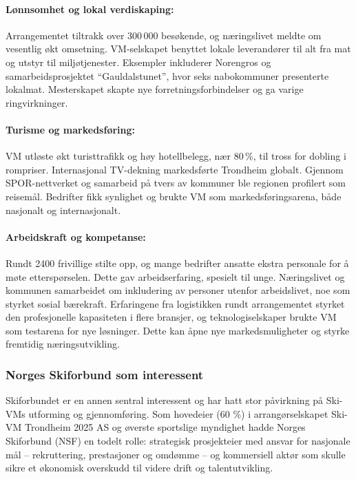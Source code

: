 \paragraph{Lønnsomhet og lokal verdiskaping:} Arrangementet tiltrakk over 300\,000 
besøkende\cite{Norengros2024}, og næringslivet meldte om vesentlig økt omsetning. 
VM-selskapet benyttet lokale leverandører til alt fra mat og utstyr til miljøtjenester. 
Eksempler inkluderer Norengros og samarbeidsprosjektet “Gauldalstunet”, hvor seks 
nabokommuner presenterte lokalmat\cite{NiT2024}. Mesterskapet skapte nye 
forretningsforbindelser og ga varige ringvirkninger.

\paragraph{Turisme og markedsføring:} VM utløste økt turisttrafikk og høy hotellbelegg, nær 80\,\%,
til tross for dobling i rompriser\cite{Finansavisen2025}. Internasjonal TV-dekning 
markedsførte Trondheim globalt. Gjennom SPOR-nettverket og samarbeid på tvers av kommuner 
ble regionen profilert som reisemål\cite{NiT2024}. Bedrifter fikk synlighet og brukte VM 
som markedsføringsarena, både nasjonalt og internasjonalt.



\paragraph{Arbeidskraft og kompetanse:} Rundt 2400 frivillige stilte 
opp\cite{TrondheimKommune2023}, og mange bedrifter ansatte ekstra personale for å møte 
etterspørselen. Dette gav arbeidserfaring, spesielt til unge. Næringslivet og kommunen 
samarbeidet om inkludering av personer utenfor arbeidslivet, noe som styrket sosial bærekraft. 
Erfaringene fra logistikken rundt arrangementet styrket den profesjonelle kapasiteten 
i flere bransjer, og teknologiselskaper brukte VM som testarena for nye løsninger. 
Dette kan åpne nye markedsmuligheter og styrke fremtidig næringsutvikling.


\subsubsection{Norges Skiforbund som interessent}
Skiforbundet er en annen sentral interessent og har hatt stor påvirkning på Ski-VMs utforming 
og gjennomføring. Som hovedeier (60 \%) i arrangørselskapet Ski-VM Trondheim 2025 AS og øverste 
sportslige myndighet hadde Norges Skiforbund (NSF) en todelt rolle: strategisk prosjekteier med 
ansvar for nasjonale mål -- rekruttering, prestasjoner og omdømme -- og kommersiell aktør som 
skulle sikre et økonomisk overskudd til videre drift og talentutvikling\cite{ProffSkiVM2025}.

